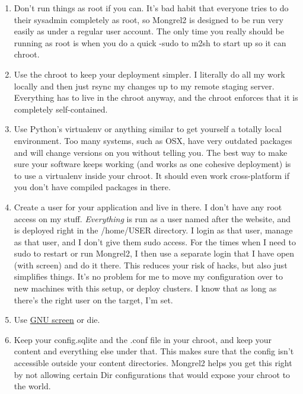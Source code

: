 \begin{enumerate}
\item Don't run things as root if you can.  It's bad habit that everyone tries to
do their sysadmin completely as root, so Mongrel2 is designed to be run very easily
as under a regular user account.  The only time you really should be running as root
is when you do a quick -sudo to m2sh to start  up so it can chroot.

\item Use the chroot to keep your deployment simpler.  I literally do all my work
locally and then just rsync my changes up to my remote staging server.  Everything
has to live in the chroot anyway, and the chroot enforces that it is completely self-contained.

\item Use Python's virtualenv or anything similar to get yourself a totally local environment.
Too many systems, such as OSX, have very outdated packages and will change versions on you
without telling you.  The best way to make sure your software keeps working (and works as
one cohesive deployment) is to use a virtualenv inside your chroot.  It should even work
cross-platform if you don't have compiled packages in there.

\item Create a user for your application and live in there.  I don't have any root
access on my stuff.  \emph{Everything} is run as a user named after the website, and
is deployed right in the /home/USER directory.  I login as that user, manage as that user,
and I don't give them sudo access.  For the times when I need to sudo to restart or run
Mongrel2, I then use a separate login that I have open (with screen) and do it there.  This
reduces your risk of hacks, but also just simplifies things.  It's no problem for me to
move my configuration over to new machines with this setup, or deploy clusters.  I know that as
long as there's the right user on the target, I'm set.

\item Use \href{http://www.gnu.org/software/screen/}{GNU screen} or die.

\item Keep your config.sqlite and the .conf file in your chroot, and keep your content and
everything else under that.  This makes sure that the config isn't accessible outside your
content directories.  Mongrel2 helps you get this right by not allowing certain Dir
configurations that would expose your chroot to the world.
\end{enumerate}


